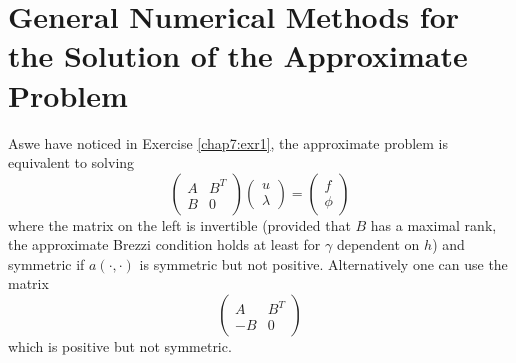 \section[General Numerical Methods for the...]{General Numerical
  Methods for the Solution of the  Approximate
  Problem} \label{chap7:ssec7.9} 
 As\pageoriginale we have 
noticed in Exercise \ref{chap7:exr1}, the approximate problem is
equivalent to solving 
\begin{equation}\label{chap7:eq7.53}
\begin{pmatrix}
A & B^T\\
B & 0
\end{pmatrix}
\begin{pmatrix}
u\\
\lambda
\end{pmatrix}
=
\begin{pmatrix}
f\\
\phi
\end{pmatrix}
\end{equation}
where the matrix on the left is invertible (provided that $B$ has a
maximal rank, \ie the approximate Brezzi condition holds at least for
$\gamma$ dependent on $h$) and symmetric if $a(\cdotp,\cdotp)$ is
symmetric but not positive. Alternatively one can use the matrix 
\begin{equation*}
\begin{pmatrix}
A & B^T\\
-B & 0
\end{pmatrix}
\end{equation*}
which is positive but not symmetric. 

